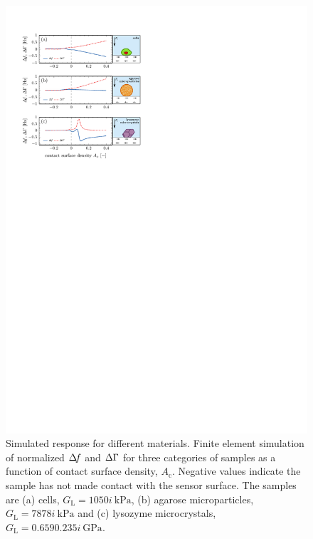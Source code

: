 \begin{figure}[ht]
 \centering
\includegraphics{qcm/figures/figure5.pdf}
\caption{Simulated response for different materials.  Finite element simulation of normalized $\Delta\!f$ and $\Delta\Gamma$ for three
 categories of samples as a function of contact surface density, 
 $A_\mathrm{c}$.
 Negative values indicate the sample has not made contact with the sensor
 surface.
 The samples are (a) cells, $G_\mathrm{L}=\SI{10+50i}{\kilo\pascal}$, (b)
 agarose microparticles, $G_\mathrm{L}=\SI{78+78i}{\kilo\pascal}$ and (c) lysozyme
 microcrystals, $G_\mathrm{L}=\SI{0.659+0.235i}{\giga\pascal}$.  }
\label{fig:multisweep}
\end{figure}

